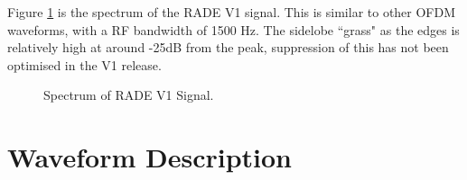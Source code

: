 \documentclass{article}
\begin{document}
Figure \ref{fig:rade_psd} is the spectrum of the RADE V1 signal. This is similar to other OFDM waveforms, with a RF bandwidth of 1500 Hz. The sidelobe ``grass" as the edges is relatively high at around -25dB from the peak, suppression of this has not been optimised in the V1 release.
  
\begin{figure}[h]
\caption{Spectrum of RADE V1 Signal.}
\label{fig:rade_psd}
\begin{center}

\end{center}
\end{figure}

\section{Waveform Description}
\end{document}

